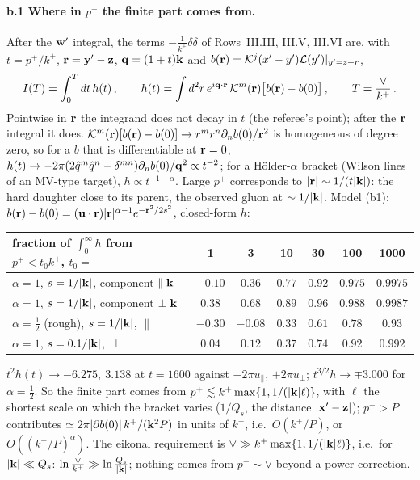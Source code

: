 \paragraph{b.1 Where in $p^+$ the finite part comes from.} After the $\mathbf{w}'$ integral, the terms $-\frac{1}{k^+}\delta\delta$ of Rows~III.III, III.V, III.VI are, with $t=p^+/k^+$, $\mathbf{r}=\mathbf{y}'-\mathbf{z}$, $\mathbf{q}=(1+t)\mathbf{k}$ and $b(\mathbf{r})=\mathcal{K}^j(x'-y')\mathcal L(y')|_{y'=z+r}$,
\begin{align}
I(T)=\int_0^Tdt\,h(t)\,,\qquad h(t)=\int d^2r\,e^{i\mathbf{q}\cdot\mathbf{r}}\,\mathcal{K}^m(\mathbf{r})\big[b(\mathbf{r})-b(0)\big]\,,\qquad T=\frac{\vee}{k^+}\,.
\end{align}
Pointwise in $\mathbf{r}$ the integrand does not decay in $t$ (the referee's point); after the $\mathbf{r}$ integral it does. $\mathcal{K}^m(\mathbf{r})[b(\mathbf{r})-b(0)]\to r^mr^n\partial_nb(0)/\mathbf{r}^2$ is homogeneous of degree zero, so for a $b$ that is differentiable at $\mathbf{r}=0$, $h(t)\to-2\pi(2\hat q^m\hat q^n-\delta^{mn})\partial_nb(0)/\mathbf{q}^2\propto t^{-2}$; for a H\"older-$\alpha$ bracket (Wilson lines of an MV-type target), $h\propto t^{-1-\alpha}$. Large $p^+$ corresponds to $|\mathbf{r}|\sim1/(t|\mathbf{k}|)$: the hard daughter close to its parent, the observed gluon at $\sim1/|\mathbf{k}|$. Model (b1): $b(\mathbf{r})-b(0)=(\mathbf{u}\cdot\mathbf{r})|\mathbf{r}|^{\alpha-1}e^{-\mathbf{r}^2/2s^2}$, closed-form $h$:
\begin{center}\footnotesize
\begin{tabular}{lcccccc}
fraction of $\int_0^\infty h$ from $p^+<t_0k^+$, $t_0=$ & 1 & 3 & 10 & 30 & 100 & 1000\\\hline
$\alpha=1$, $s=1/|\mathbf{k}|$, component $\parallel\mathbf{k}$ & $-0.10$ & $0.36$ & $0.77$ & $0.92$ & $0.975$ & $0.9975$\\
$\alpha=1$, $s=1/|\mathbf{k}|$, component $\perp\mathbf{k}$ & $0.38$ & $0.68$ & $0.89$ & $0.96$ & $0.988$ & $0.9987$\\
$\alpha=\frac12$ (rough), $s=1/|\mathbf{k}|$, $\parallel$ & $-0.30$ & $-0.08$ & $0.33$ & $0.61$ & $0.78$ & $0.93$\\
$\alpha=1$, $s=0.1/|\mathbf{k}|$, $\perp$ & $0.04$ & $0.12$ & $0.37$ & $0.74$ & $0.92$ & $0.992$
\end{tabular}\end{center}
$t^2h(t)\to-6.275,\ 3.138$ at $t=1600$ against $-2\pi u_\parallel$, $+2\pi u_\perp$; $t^{3/2}h\to\mp3.000$ for $\alpha=\frac12$. So the finite part comes from $p^+\lesssim k^+\max\{1,1/(|\mathbf{k}|\ell)\}$, with $\ell$ the shortest scale on which the bracket varies ($1/Q_s$, the distance $|\mathbf{x}'-\mathbf{z}|$); $p^+>P$ contributes $\simeq2\pi|\partial b(0)|\,k^+/(\mathbf{k}^2P)$ in units of $k^+$, i.e.\ $O(k^+/P)$, or $O((k^+/P)^\alpha)$. The eikonal requirement is $\vee\gg k^+\max\{1,1/(|\mathbf{k}|\ell)\}$, i.e.\ for $|\mathbf{k}|\ll Q_s$: $\ln\frac{\vee}{k^+}\gg\ln\frac{Q_s}{|\mathbf{k}|}$; nothing comes from $p^+\sim\vee$ beyond a power correction.

